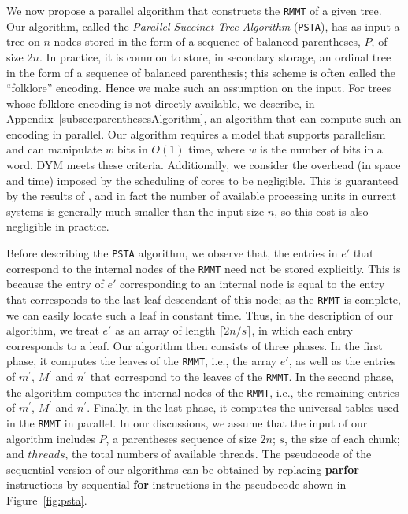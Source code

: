 We now propose a parallel algorithm that constructs the {\tt RMMT} of a given tree. Our algorithm, called the
\emph{Parallel Succinct Tree Algorithm} ({\tt PSTA}), has as input a
tree on $n$ nodes stored in the form of a sequence of balanced parentheses, $P$, of
size $2n$.
In practice, it is common to store, in secondary storage, an ordinal tree in the form of a sequence of balanced parenthesis; this scheme is often called the ``folklore'' encoding.
Hence we make such an assumption on the input. 
For trees whose folklore encoding is not directly available, we describe, in Appendix~\ref{subsec:parenthesesAlgorithm}, an algorithm that can compute such an encoding in parallel. 
Our algorithm requires a model that supports
parallelism and can manipulate $w$ bits in $O(1)$ time, where $w$ is the number of bits in a word. DYM meets these
criteria. Additionally, we consider  the overhead (in space and 
time) imposed by the scheduling of cores to be negligible. This is
guaranteed by the results of \cite{Blumofe:1999:SMC:324133.324234}, and in fact the number of available processing units in current systems is generally much smaller than the input size $n$, so this cost is also negligible in practice.

Before describing the {\tt PSTA} algorithm, we observe that, the entries in $e'$ that correspond to the internal nodes of the {\tt RMMT} need not be stored explicitly.
This is because the entry of $e'$ corresponding to an internal node is equal to the entry that corresponds to the last leaf descendant of this node; as the {\tt RMMT} is complete, we can easily locate such a leaf in constant time.
Thus, in the description of our algorithm, we treat $e'$ as an array of length $\lceil 2n / s\rceil$, in which each entry corresponds to a leaf.
Our algorithm then consists of three phases. In the first phase, it computes the leaves of the {\tt RMMT}, i.e., the array $e'$, as well as the entries of $m^{\prime}$, $M^{\prime}$ and $n^{\prime}$ that correspond to the leaves of the {\tt RMMT}.
In the second phase, the algorithm computes the internal nodes of the
{\tt RMMT}, i.e., the remaining entries of $m^{\prime}$, $M^{\prime}$ and $n^{\prime}$. 
Finally, in the last phase, it computes the universal tables used in the {\tt RMMT} in parallel.
In our discussions, we assume that the input of our algorithm includes $P$, a parentheses
sequence of size $2n$; $s$, the size of each chunk; and $threads$, the total numbers of available
threads.
The pseudocode of the sequential version of our algorithms can be obtained by replacing {\bf parfor} instructions by 
sequential {\bf for} instructions in the pseudocode shown in Figure~\ref{fig:psta}.

